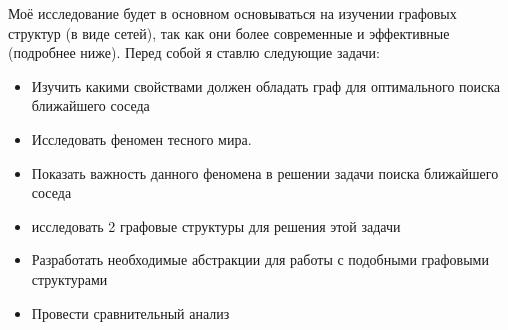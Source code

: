\begin{justify}
    Моё исследование будет в основном основываться на изучении
    графовых структур (в виде сетей), так как они более современные
    и эффективные (подробнее ниже). Перед собой я ставлю следующие 
    задачи:
    \begin{itemize}
        \item Изучить какими свойствами должен обладать граф для оптимального
        поиска бли\-жайшего соседа
        \item Исследовать феномен тесного мира.
        \item Показать важность данного феномена в решении задачи поиска ближайшего соседа
        \item исследовать 2 графовые структуры для решения этой задачи
        \item Разработать необходимые абстракции для работы с подобными
        графовыми струк\-турами
        \item Провести сравнительный анализ
    \end{itemize}    
    
    
\end{justify}


